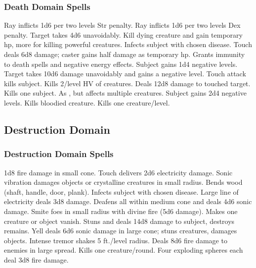 \subsubsection{Death Domain Spells}
\begin{spelllist}
 Ray inflicts 1d6  per two levels Str penalty.
 Ray inflicts 1d6  per two levels Dex penalty.
 Target takes 4d6 unavoidably.
 Kill dying creature and gain temporary hp, more for killing powerful creatures.
 Infects subject with chosen disease.
 Touch deals 6d8 damage; caster gains half damage as temporary hp.
 Grants immunity to death spells and negative energy effects.
 Subject gains 1d4 negative levels.
 Target takes 10d6 damage unavoidably and gains a negative level.
 Touch attack kills subject.
\M Kills 2/level HV of creatures.
 Deals 12d8 damage to touched target.
 Kills one subject.
\spellhead[7]{} 
 As , but affects multiple creatures.
 Subject gains 2d4 negative levels.
 Kills bloodied creature.
 Kills one creature/level.
\end{spelllist}

\subsection{Destruction Domain}

\subsubsection{Destruction Domain Spells}
\begin{spelllist}
 1d8 fire damage in small cone.
 Touch delivers 2d6 electricity damage.
 Sonic vibration damages objects or crystalline creatures in small radius.
 Bends wood (shaft, handle, door, plank).
 Infects subject with chosen disease.
 Large line of electricity deals 3d8 damage.
 Deafens all within medium cone and deals 4d6 sonic damage.
\spellhead[4]{}
 Smite foes in small radius with divine fire (5d6 damage).
\spellhead[5]{}
 Makes one creature or object vanish.
\F Stuns and deals 14d8 damage to subject, destroys remains.
 Yell deals 6d6 sonic damage in large cone; stuns creatures, damages objects.
 Intense tremor shakes 5 ft./level radius.
 Deals 8d6 fire damage to enemies in large spread.
 Kills one creature/round.
 Four exploding spheres each deal 3d8 fire damage.
\end{spelllist}

